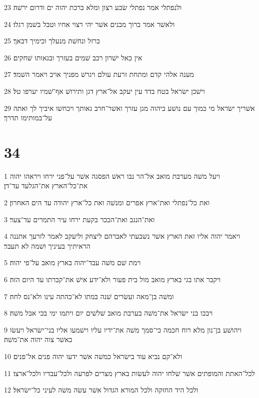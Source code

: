 \par 23 ולנפתלי אמר נפתלי שׂבע רצון ומלא ברכת יהוה ים ודרום ירשׁה׃
\par 24 ולאשׁר אמר ברוך מבנים אשׁר יהי רצוי אחיו וטבל בשׁמן רגלו׃
\par 25 ברזל ונחשׁת מנעלך וכימיך דבאך׃
\par 26 אין כאל ישׁרון רכב שׁמים בעזרך ובגאותו שׁחקים׃
\par 27 מענה אלהי קדם ומתחת זרעת עולם ויגרשׁ מפניך אויב ויאמר השׁמד׃
\par 28 וישׁכן ישׂראל בטח בדד עין יעקב אל־ארץ דגן ותירושׁ אף־שׁמיו יערפו טל׃
\par 29 אשׁריך ישׂראל מי כמוך עם נושׁע ביהוה מגן עזרך ואשׁר־חרב גאותך ויכחשׁו איביך לך ואתה על־במותימו תדרך׃

\chapter{34}

\par 1 ויעל משׁה מערבת מואב אל־הר נבו ראשׁ הפסגה אשׁר על־פני ירחו ויראהו יהוה את־כל־הארץ את־הגלעד עד־דן׃
\par 2 ואת כל־נפתלי ואת־ארץ אפרים ומנשׁה ואת כל־ארץ יהודה עד הים האחרון׃
\par 3 ואת־הנגב ואת־הככר בקעת ירחו עיר התמרים עד־צער׃
\par 4 ויאמר יהוה אליו זאת הארץ אשׁר נשׁבעתי לאברהם ליצחק וליעקב לאמר לזרעך אתננה הראיתיך בעיניך ושׁמה לא תעבר׃
\par 5 וימת שׁם משׁה עבד־יהוה בארץ מואב על־פי יהוה׃
\par 6 ויקבר אתו בגי בארץ מואב מול בית פעור ולא־ידע אישׁ את־קברתו עד היום הזה׃
\par 7 ומשׁה בן־מאה ועשׂרים שׁנה במתו לא־כהתה עינו ולא־נס לחה׃
\par 8 ויבכו בני ישׂראל את־משׁה בערבת מואב שׁלשׁים יום ויתמו ימי בכי אבל משׁה׃
\par 9 ויהושׁע בן־נון מלא רוח חכמה כי־סמך משׁה את־ידיו עליו וישׁמעו אליו בני־ישׂראל ויעשׂו כאשׁר צוה יהוה את־משׁה׃
\par 10 ולא־קם נביא עוד בישׂראל כמשׁה אשׁר ידעו יהוה פנים אל־פנים׃
\par 11 לכל־האתת והמופתים אשׁר שׁלחו יהוה לעשׂות בארץ מצרים לפרעה ולכל־עבדיו ולכל־ארצו׃
\par 12 ולכל היד החזקה ולכל המורא הגדול אשׁר עשׂה משׁה לעיני כל־ישׂראל׃


